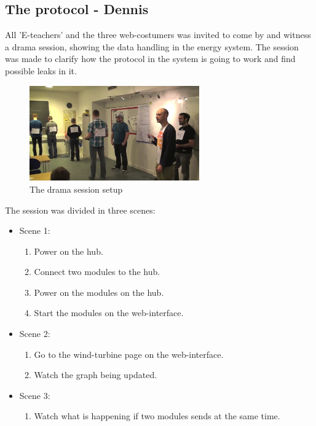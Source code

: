 \subsection{The protocol - Dennis}
All 'E-teachers' and the three web-costumers was invited to come by and witness a drama session, showing the data handling in the energy system. The session was made to clarify how the protocol in the system is going to work and find possible leaks in it. 
\begin{figure}[H]
	\center
		\includegraphics[width=0.65\textwidth]{images/drama_setup.png}
   	\caption{The drama session setup}
   	\label{fig:drama_session_setup}
\end{figure}

The session was divided in three scenes:
\begin{itemize}
	\item Scene 1:
		\begin{enumerate}
			\item Power on the hub.
			\item Connect two modules to the hub.
			\item Power on the modules on the hub.
			\item Start the modules on the web-interface.
		\end{enumerate}
	\item Scene 2:
		\begin{enumerate}
			\item Go to the wind-turbine page on the web-interface.
			\item Watch the graph being updated.
		\end{enumerate}
	\item Scene 3:
		\begin{enumerate}
			\item Watch what is happening if two modules sends at the same time.
		\end{enumerate}
\end{itemize}

